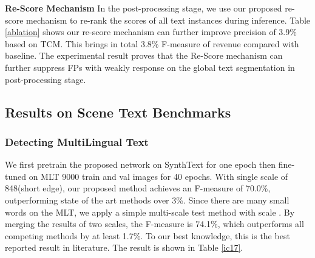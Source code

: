 \documentclass[letterpaper]{article} \usepackage{aaai19}  \usepackage{times}  \usepackage{helvet}  \usepackage{courier}  \usepackage{url}  \usepackage{graphicx}
\begin{document}
\textbf{Re-Score Mechanism}
In the post-processing stage, we use our proposed re-score mechanism to re-rank the scores of all text instances during inference.
Table \ref{ablation} shows our re-score mechanism can further improve precision of 3.9\% based on TCM.
This brings in total 3.8\% F-measure of revenue compared with baseline.
The experimental result proves that the Re-Score mechanism can further suppress FPs with weakly response on the global text segmentation in post-processing stage. 


\subsection{Results on Scene Text Benchmarks}
\subsubsection{Detecting MultiLingual Text } 
We first pretrain the proposed network on SynthText for one epoch then fine-tuned on MLT 9000 train and val images for 40 epochs. 
With single scale of 848(short edge), our proposed method achieves an F-measure of 70.0\%, outperforming state of the art methods over 3\%.
 Since there are many small words on the MLT, we apply a simple multi-scale test method with scale . By merging the results of two scales, the F-measure is 74.1\%, which outperforms all competing methods by at least 1.7\%.  
To our best knowledge, this is the best reported result in literature.
The result is shown in Table \ref{ic17}.





\begin{table}[htb]
\center
{}
\caption{\label{ic17}Effectiveness of several methods on ICDAR2017 MLT incidental scene text location task.  means multi scale test.}
\end{table}
\end{document}
